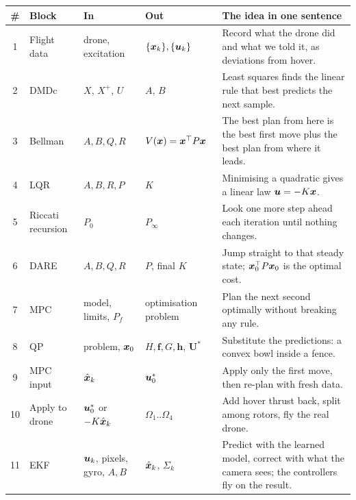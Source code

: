 \begin{center}\small
\begin{tabularx}{\linewidth}{@{}c >{\raggedright\arraybackslash}p{2.9cm} >{\raggedright\arraybackslash}p{3.2cm} >{\raggedright\arraybackslash}p{3.0cm} X@{}}
\toprule
\textbf{\#} & \textbf{Block} & \textbf{In} & \textbf{Out} & \textbf{The idea in one sentence}\\
\midrule
1 & Flight data & drone, excitation & $\{\bm{x}_k\},\{\bm{u}_k\}$ & Record what the drone did and what we told it, as deviations from hover.\\
2 & DMDc & $X$, $X^+$, $U$ & $A$, $B$ & Least squares finds the linear rule that best predicts the next sample.\\
3 & Bellman & $A,B,Q,R$ & $V(\bm{x})=\bm{x}^\top P\bm{x}$ & The best plan from here is the best first move plus the best plan from where it leads.\\
4 & LQR & $A,B,R,P$ & $K$ & Minimising a quadratic gives a linear law $\bm{u}=-K\bm{x}$.\\
5 & Riccati recursion & $P_0$ & $P_\infty$ & Look one more step ahead each iteration until nothing changes.\\
6 & DARE & $A,B,Q,R$ & $P$, final $K$ & Jump straight to that steady state; $\bm{x}_0^\top P\bm{x}_0$ is the optimal cost.\\
7 & MPC & model, limits, $P_f$ & optimisation problem & Plan the next second optimally without breaking any rule.\\
8 & QP & problem, $\bm{x}_0$ & $H,\bm f,G,\bm h$, $\mathbf U^*$ & Substitute the predictions: a convex bowl inside a fence.\\
9 & MPC input & $\hat{\bm x}_k$ & $\bm{u}_0^*$ & Apply only the first move, then re-plan with fresh data.\\
10 & Apply to drone & $\bm{u}_0^*$ or $-K\hat{\bm x}_k$ & $\Omega_1..\Omega_4$ & Add hover thrust back, split among rotors, fly the real drone.\\
11 & EKF & $\bm{u}_k$, pixels, gyro, $A,B$ & $\hat{\bm x}_k$, $\Sigma_k$ & Predict with the learned model, correct with what the camera sees; the controllers fly on the result.\\
\bottomrule
\end{tabularx}
\end{center}
